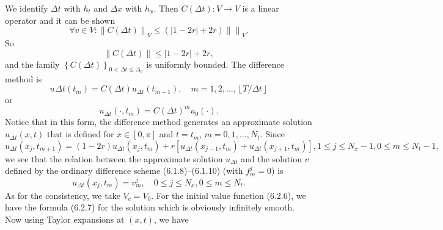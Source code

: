 \begin{frame}
	We identify $\Delta t$ with $h_{t}$ and $\Delta x$ with $h_{x}$.
	Then $C\left(\Delta t\right)\colon V \to V$ is a linear operator and it can be shown
	\begin{equation*}
		\forall v\in V:
		{\left\|C\left(\Delta t\right)\right\|}_{V}\leq
		\left(\left|1-2r\right|+2r\right)
		\left\|\right\|_{V}.
	\end{equation*}
	So
	\begin{equation*}
		\left\|C\left(\Delta t\right)\right\|\leq
		\left|1-2r\right|+2r,
	\end{equation*}
	and the family $\left\{C\left(\Delta t\right)\right\}_{0<\Delta t\leq\Delta_{0}}$ is uniformly bounded.
	The difference method is
	\begin{equation*}
		u_{}{\Delta t}\left(t_{m}\right)=
		C\left(\Delta t\right)
		u_{\Delta t}\left(t_{m-1}\right),\quad m=1,2,\dotsc,\left\lfloor T/\Delta t\right\rfloor
	\end{equation*}
	or
	\begin{equation*}
		u_{\Delta t}\left(\cdot,t_{m}\right)=
			{C\left(\Delta t\right)}^m
		u_{0}\left(\cdot\right).
	\end{equation*}
	Notice that in this form, the difference method generates an approximate
	solution $u_{\Delta t}\left(x,t\right)$ that is defined for
	$x\in\left[0,\pi\right]$ and $t=t_{m}$, $m=0,1,\dotsc,N_{t}$.
	Since
	\begin{equation*}
		u_{\Delta t}\left(x_{j},t_{m+1}\right)=
		\left(1-2r\right)u_{\Delta t}\left(x_{j},t_{m}\right)+
		r\left[u_{\Delta t}\left(x_{j-1},t_{m}\right)+u_{\Delta t}\left(x_{j+1},t_{m}\right)\right],
		1\leq j\leq N_{x}-1, 0\leq m\leq N_{t}-1,
	\end{equation*}
	we see that the relation between the approximate solution $u_{\Delta t}$ and the
	solution $v$ defined by the ordinary difference scheme (6.1.8)–(6.1.10) (with
	$f_m^j = 0$) is
	\begin{equation*}
		u_{\Delta t}
		\left(x_{j},t_{m}\right)=v_{m}^{j},
		\quad 0\leq j\leq N_{x}, 0\leq m\leq N_{t}.
	\end{equation*}
	As for the consistency, we take $V_{c}=V_{0}$.
	For the initial value function (6.2.6), we have the formula (6.2.7)
	for the solution which is obviously infinitely smooth.
	Now using Taylor expansions at $\left(x,t\right)$, we have
\end{frame}

